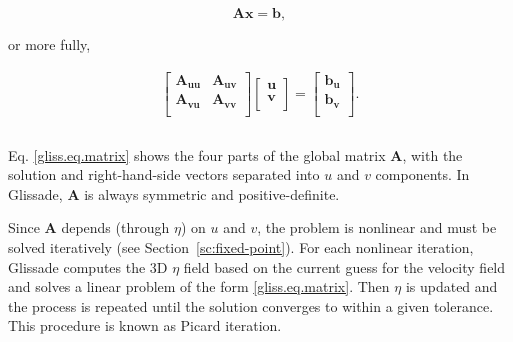 \begin{equation}
  \label{gliss.eq.matrix_full}
  \mathbf{A} \mathbf{x} = \mathbf{b},
\end{equation}

\noindent
or more fully,

\begin{equation}
  \label{gliss.eq.matrix}
  \begin{matrix}
    \left[ \begin{matrix}
        \mathbf{A}_{\mathbf{uu}} & \mathbf{A}_{\mathbf{uv}}  \\
        \mathbf{A}_{\mathbf{vu}} & \mathbf{A}_{\mathbf{vv}}  \\
      \end{matrix} \right]\left[ \begin{matrix}
        \mathbf{u}  \\
        \mathbf{v}  \\
      \end{matrix} \right]=\left[ \begin{matrix}
        \mathbf{b}_{\mathbf{u}}  \\
        \mathbf{b}_{\mathbf{v}}  \\
      \end{matrix} \right]. \\ 
    \\ 
  \end{matrix}
\end{equation}

\noindent
Eq. \eqref{gliss.eq.matrix} shows the four parts of the global matrix $\mathbf{A}$,
with the solution and right-hand-side vectors separated into $u$ and $v$ components.
In Glissade, $\mathbf{A}$ is always symmetric and positive-definite.

Since $\mathbf{A}$ depends (through $\eta$) on $u$ and $v$, the problem is nonlinear and must be solved iteratively
(see Section~\ref{sc:fixed-point}).
For each nonlinear iteration, Glissade computes the 3D $\eta$ field based on the
current guess for the velocity field and solves a linear problem of the form \eqref{gliss.eq.matrix}.
Then $\eta$ is updated and the process is repeated until the solution converges to within a given tolerance.
This procedure is known as Picard iteration.


